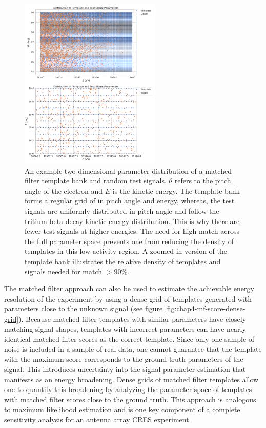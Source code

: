 \begin{figure}[htbp]
    \centering
    \includegraphics*[width=0.6\textwidth]{figs/Chapter-4/230725_matched_filter_grid_example.png}
    \caption{\label{fig:chap4-mf-parameter-grid} An example two-dimensional parameter distribution of a matched filter template bank and random test signals. $\theta$ refers to the pitch angle of the electron and $E$ is the kinetic energy. The template bank forms a regular grid of in pitch angle and energy, whereas, the test signals are uniformly distributed in pitch angle and follow the tritium beta-decay kinetic energy distribution. This is why there are fewer test signals at higher energies. The need for high match across the full parameter space prevents one from reducing the density of templates in this low activity region. A zoomed in version of the template bank illustrates the relative density of templates and signals needed for match $>90\%$. }
\end{figure}

The matched filter approach can also be used to estimate the achievable energy resolution of the experiment by using a dense grid of templates generated with parameters close to the unknown signal (see figure \ref{fig:chap4-mf-score-dense-grid}). Because matched filter templates with similar parameters have closely matching signal shapes, templates with incorrect parameters can have nearly identical matched filter scores as the correct template. Since only one sample of noise is included in a sample of real data, one cannot guarantee that the template with the maximum score corresponds to the ground truth parameters of the signal. This introduces uncertainty into the signal parameter estimation that manifests as an energy broadening. Dense grids of matched filter templates allow one to quantify this broadening by analyzing the parameter space of templates with matched filter scores close to the ground truth. This approach is analogous to maximum likelihood estimation and is one key component of a complete sensitivity analysis for an antenna array CRES experiment.

